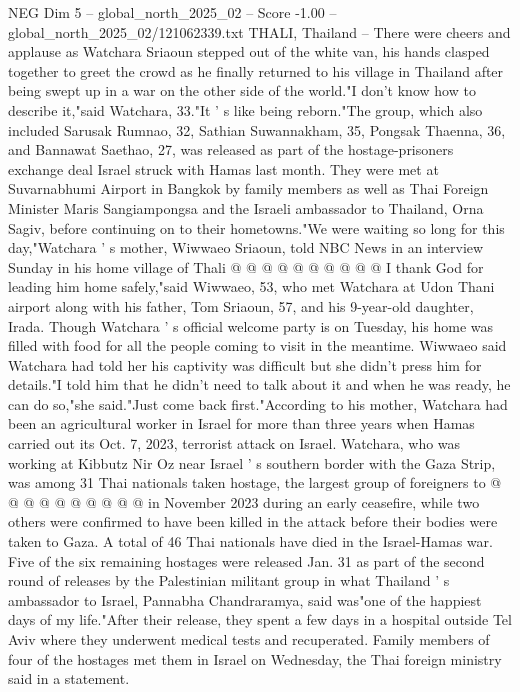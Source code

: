 \begin{textsample}{NEG Dim 5 – global\_north\_2025\_02 – Score -1.00 – global\_north\_2025\_02/121062339.txt}  \label{ex:f5_neg_245}
THALI, Thailand -- There were cheers and applause as Watchara Sriaoun stepped out of the white van, his hands clasped together to greet the crowd as he finally returned to his village in Thailand after being swept up in a war on the other side of the world."I don't know how to describe it,"said Watchara, 33."It ' s like being reborn."The group, which also included Sarusak Rumnao, 32, Sathian Suwannakham, 35, Pongsak Thaenna, 36, and Bannawat Saethao, 27, was released as part of the hostage-prisoners exchange deal Israel struck with Hamas last month.
They were met at Suvarnabhumi Airport in Bangkok by family members as well as Thai Foreign Minister Maris Sangiampongsa and the Israeli ambassador to Thailand, Orna Sagiv, before continuing on to their hometowns."We were waiting so long for this day,"Watchara ' s mother, Wiwwaeo Sriaoun, told NBC News in an interview Sunday in his home village of Thali @ @ @ @ @ @ @ @ @ @ I thank God for leading him home safely,"said Wiwwaeo, 53, who met Watchara at Udon Thani airport along with his father, Tom Sriaoun, 57, and his 9-year-old daughter, Irada.
Though Watchara ' s official welcome party is on Tuesday, his home was filled with food for all the people coming to visit in the meantime.
Wiwwaeo said Watchara had told her his captivity was difficult but she didn't press him for details."I told him that he didn't need to talk about it and when he was ready, he can do so,"she said."Just come back first."According to his mother, Watchara had been an agricultural worker in Israel for more than three years when Hamas carried out its Oct. 7, 2023, terrorist attack on Israel.
Watchara, who was working at Kibbutz Nir Oz near Israel ' s southern border with the Gaza Strip, was among 31 Thai nationals taken hostage, the largest group of foreigners to @ @ @ @ @ @ @ @ @ @ in November 2023 during an early ceasefire, while two others were confirmed to have been killed in the attack before their bodies were taken to Gaza.
A total of 46 Thai nationals have died in the Israel-Hamas war.
Five of the six remaining hostages were released Jan. 31 as part of the second round of releases by the Palestinian militant group in what Thailand ' s ambassador to Israel, Pannabha Chandraramya, said was"one of the happiest days of my life."After their release, they spent a few days in a hospital outside Tel Aviv where they underwent medical tests and recuperated.
Family members of four of the hostages met them in Israel on Wednesday, the Thai foreign ministry said in a statement.

\end{textsample}
